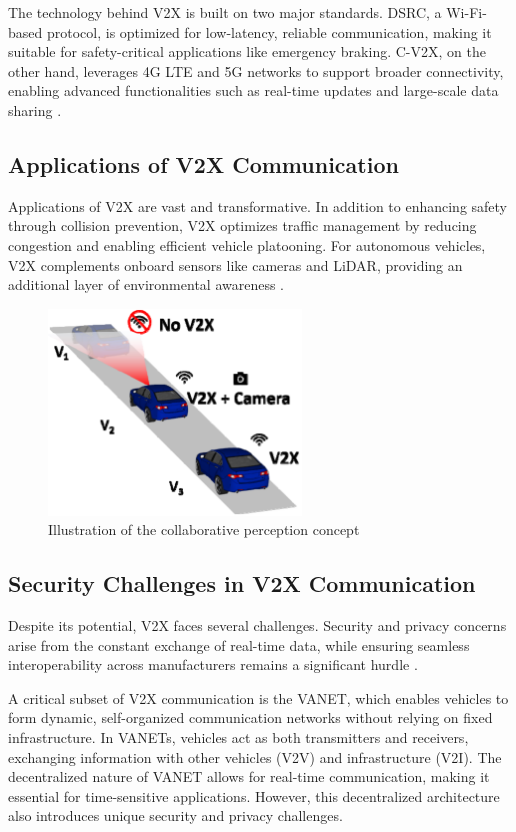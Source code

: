  The technology behind V2X is built on two major standards. \ac{DSRC},
 a Wi-Fi-based protocol, is optimized for low-latency, reliable communication, making it suitable for 
 safety-critical applications like emergency braking. \ac{C-V2X}, on the other hand, leverages 
 4G LTE and 5G networks to support broader connectivity, enabling advanced functionalities such as real-time updates and 
 large-scale data sharing \cite{cite-key1}. 

 \subsection{Applications of V2X Communication}

Applications of V2X are vast and transformative. In addition to enhancing safety through 
collision prevention, V2X optimizes traffic management by reducing congestion and enabling 
efficient vehicle platooning. For autonomous vehicles, V2X complements onboard sensors like 
cameras and LiDAR, providing an additional layer of environmental awareness \cite{8690818,Sidorenko2024}. 
\begin{figure}[H]
  \centering
  \includegraphics[width=0.6\textwidth]{images/figure3.png}
  \caption{Illustration of the collaborative perception concept}
  \label{fig:fig3}
\end{figure}

\subsection{Security Challenges in V2X Communication}

Despite its potential, V2X faces several challenges. Security and privacy concerns arise from the constant exchange 
of real-time data, while ensuring seamless interoperability across manufacturers remains a significant hurdle \cite{zEslami}.

A critical subset of V2X communication is the \ac{VANET}, which enables vehicles to form dynamic,
 self-organized communication networks without relying on fixed infrastructure. In VANETs, vehicles act as both transmitters
  and receivers, exchanging information with other vehicles (V2V) and infrastructure (V2I). The decentralized nature of VANET allows for real-time 
  communication, making it essential for time-sensitive applications. However, this decentralized architecture also 
  introduces unique security and privacy challenges.

